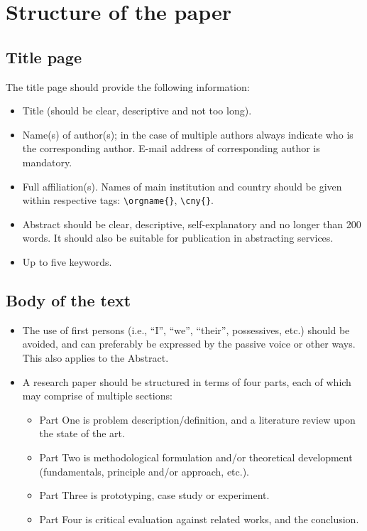 \documentclass[ds]{iosart2x}
\begin{document}
\section{Structure of the paper}
\subsection{Title page}

The title page should provide the following information:

\begin{itemize}
\item Title (should be clear, descriptive and not too long).
\item  Name(s) of author(s); in the case of multiple authors always indicate who is the corresponding
author. E-mail address of corresponding author is mandatory.
\item  Full affiliation(s). Names of main institution and country should be given within respective tags: \verb|\orgname{}|, \verb|\cny{}|.
\item  Abstract should be clear, descriptive, self-expla\-na\-tory and no longer than 200
words. It should also be suitable for publication in abstracting services.
\item  Up to five keywords.
\end{itemize}

\subsection{Body of the text}
\begin{itemize}
\item The use of first persons (i.e., ``I'', ``we'', ``their'', possessives, etc.) should be avoided,
and can preferably be expressed by the passive voice or other ways. This also applies to the Abstract.
\item A research paper should be structured in terms of four parts, each of which may comprise of multiple sections:
\begin{itemize}
\item Part One is problem description/definition, and a literature review upon the state of the
art.
\item Part Two is methodological formulation and/or theoretical development (fundamentals, principle and/or approach,
etc.).
\item Part Three is prototyping, case study or experiment.
\item Part Four is critical evaluation against related works, and the
conclusion.
\end{itemize}
\end{itemize}
\end{document}
